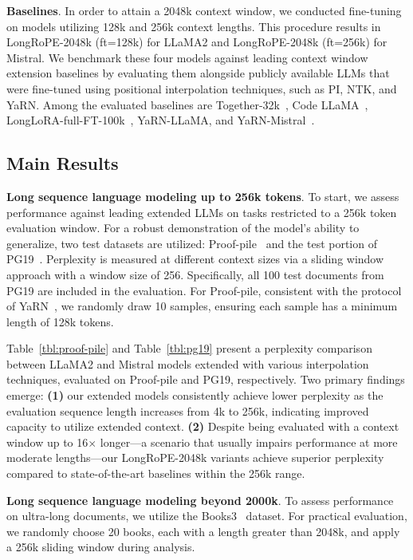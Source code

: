 \textbf{Baselines}. In order to attain a 2048k context window, we conducted fine-tuning on models utilizing 128k and 256k context lengths. This procedure results in LongRoPE-2048k (ft=128k) for LLaMA2 and LongRoPE-2048k (ft=256k) for Mistral. We benchmark these four models against leading context window extension baselines by evaluating them alongside publicly available LLMs that were fine-tuned using positional interpolation techniques, such as PI, NTK, and YaRN. Among the evaluated baselines are Together-32k~\cite{together}, Code LLaMA~\cite{codellama}, LongLoRA-full-FT-100k~\cite{longlora}, YaRN-LLaMA, and YaRN-Mistral~\cite{yarn}.

\subsection{Main Results}

\label{sec:mainresult}
\textbf{Long sequence language modeling up to 256k tokens}. To start, we assess performance against leading extended LLMs on tasks restricted to a 256k token evaluation window. For a robust demonstration of the model’s ability to generalize, two test datasets are utilized: Proof-pile~\cite{pg19} and the test portion of PG19~\cite{pile}. Perplexity is measured at different context sizes via a sliding window approach with a window size of 256. Specifically, all 100 test documents from PG19 are included in the evaluation. For Proof-pile, consistent with the protocol of YaRN~\cite{yarn}, we randomly draw 10 samples, ensuring each sample has a minimum length of 128k tokens.

Table~\ref{tbl:proof-pile} and Table~\ref{tbl:pg19} present a perplexity comparison between LLaMA2 and Mistral models extended with various interpolation techniques, evaluated on Proof-pile and PG19, respectively. Two primary findings emerge: \textbf{(1)} our extended models consistently achieve lower perplexity as the evaluation sequence length increases from 4k to 256k, indicating improved capacity to utilize extended context. \textbf{(2)} Despite being evaluated with a context window up to 16$\times$ longer—a scenario that usually impairs performance at more moderate lengths—our LongRoPE-2048k variants achieve superior perplexity compared to state-of-the-art baselines within the 256k range.

\textbf{Long sequence language modeling beyond 2000k}. To assess performance on ultra-long documents, we utilize the Books3~\cite{pile} dataset. For practical evaluation, we randomly choose 20 books, each with a length greater than 2048k, and apply a 256k sliding window during analysis.

